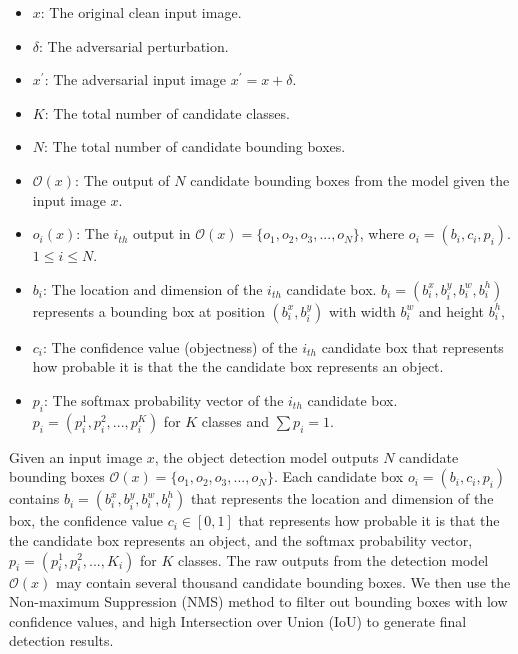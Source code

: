 \begin{itemize}
    \item $x$: The original clean input image.
    \item $\delta$: The adversarial perturbation.
    \item $x^{'}$: The adversarial input image $x^{'} = x + \delta$.
    \item $K$: The total number of candidate classes.
    \item $N$: The total number of candidate bounding boxes.
    \item $\mathcal{O}(x)$: The output of $N$ candidate bounding boxes from the model given the input image $x$. 
    \item $o_i(x)$: The $i_{th}$ output in $\mathcal{O}(x) = \{o_1, o_2, o_3, ..., o_N\}$, where $o_i=(b_i, c_i, p_i)$. $1 \leq i \leq N$.
    \item $b_i$: The location and dimension of the $i_{th}$ candidate box. $b_i=(b^x_i, b^y_i, b^w_i, b^h_i)$ represents a bounding box at position $(b^x_i, b^y_i)$ with width $b^w_i$ and height $b^h_i$,
    \item $c_i$: The confidence value (objectness) of the $i_{th}$ candidate box that represents how probable it is that the the candidate box represents an object.
    \item $p_i$: The softmax probability vector of the $i_{th}$ candidate box. $p_i=(p^1_i, p^2_i, ..., p^K_i)$ for $K$ classes and $\sum{p_i}=1$.
\end{itemize}

Given an input image $x$, the object detection model outputs $N$ candidate bounding boxes $\mathcal{O}(x) = \{o_1, o_2, o_3, ..., o_N\}$. Each candidate box $o_i=(b_i, c_i, p_i)$ contains $b_i=(b^x_i, b^y_i, b^w_i, b^h_i)$ that represents the location and dimension of the box, the confidence value $c_i \in [0, 1]$ that represents how probable it is that the the candidate box represents an object, and the softmax probability vector, $p_i=(p^1_i, p^2_i, ..., K_i)$ for $K$ classes. The raw outputs from the detection model $\mathcal{O}(x)$ may contain several thousand candidate bounding boxes. We then use the Non-maximum Suppression (NMS) method \citep{bodla2017soft} to filter out bounding boxes with low confidence values, and high Intersection over Union (IoU) to generate final detection results.


